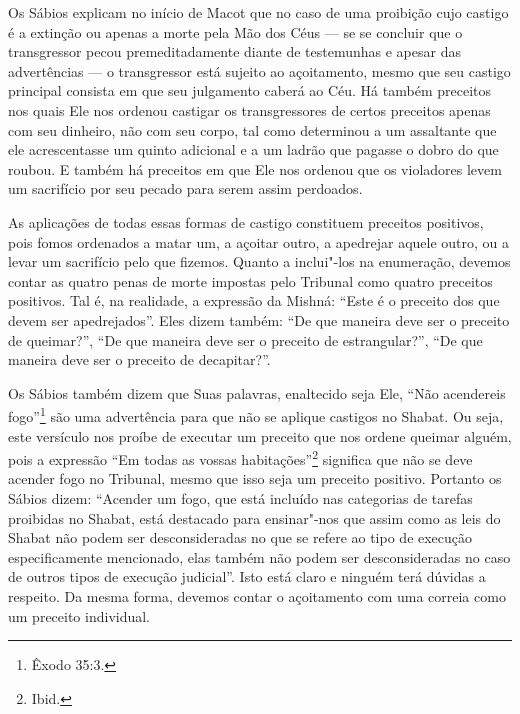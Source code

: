 Os Sábios explicam no início de Macot\starr{} que no caso de uma proibição cujo
castigo é a extinção ou apenas a morte pela Mão dos Céus --- se se
concluir que o transgressor pecou premeditadamente diante de testemunhas
e apesar das advertências --- o transgressor está sujeito ao
açoitamento, mesmo que seu castigo principal consista em que seu
julgamento caberá ao Céu. Há também preceitos nos quais Ele nos ordenou
castigar os transgressores de certos preceitos apenas com seu dinheiro,
não com seu corpo, tal como determinou a um assaltante que ele acrescentasse um quinto adicional e a um
ladrão que pagasse o dobro do que roubou. E também há preceitos em que
Ele nos ordenou que os violadores levem um sacrifício por seu pecado
para serem assim perdoados.

As aplicações de todas essas formas de castigo constituem preceitos
positivos, pois fomos ordenados a matar um, a açoitar outro, a apedrejar
aquele outro, ou a levar um sacrifício pelo que fizemos. Quanto a
inclui"-los na enumeração, devemos contar as quatro penas de morte
impostas pelo Tribunal como quatro preceitos positivos. Tal é, na
realidade, a expressão da Mishná\starr: ``Este é o preceito dos que devem ser
apedrejados''. Eles dizem também: ``De que maneira deve ser o preceito
de queimar?'', ``De que maneira deve ser o preceito de estrangular?'',
``De que maneira deve ser o preceito de decapitar?''.

Os Sábios também dizem que Suas palavras, enaltecido seja Ele, ``Não
acendereis fogo''\footnote{Êxodo 35:3.} são uma advertência para que não se
aplique castigos no Shabat. Ou seja, este versículo nos proíbe de
executar um preceito que nos ordene queimar alguém, pois a expressão
``Em todas as vossas habitações''\footnote{Ibid.} significa que não se deve
acender fogo no Tribunal, mesmo que isso seja um preceito positivo.
Portanto os Sábios dizem: ``Acender um fogo, que está incluído nas
categorias de tarefas proibidas no Shabat, está destacado para
ensinar"-nos que assim como as leis do Shabat não podem ser
desconsideradas no que se refere ao tipo de execução especificamente
mencionado, elas também não podem ser desconsideradas no caso de outros
tipos de execução judicial''. Isto está claro e ninguém terá dúvidas a
respeito. Da mesma forma, devemos contar o açoitamento com uma correia
como um preceito individual.

